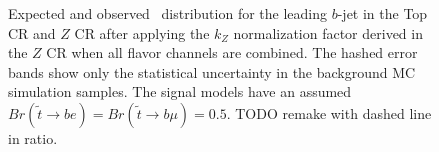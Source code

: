\begin{figure}
  \centering
  \caption{Expected and observed \pt\ distribution for the leading $b$-jet in
    the Top CR and $Z$ CR after applying the $k_Z$ normalization factor derived
    in the $Z$ CR when all flavor channels are combined.
    The hashed error bands show only the statistical uncertainty in the
    background MC simulation samples.
    The signal models have an assumed
    $Br(\tilde{t}\rightarrow be) = Br(\tilde{t}\rightarrow b\mu) = 0.5$.
    {\color{red} TODO remake with dashed line in ratio.}
  }
  \label{fig:cr_b_jet_pt_0__w_norm_factor}
\end{figure}

